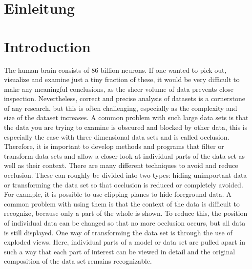 {\chapter{Einleitung}}
{\chapter{Introduction}}

\label{sec:introduction}

The human brain consists of 86 billion neurons\cite{peichl_2015}. If one wanted to pick out, visualize and examine just a tiny fraction of these, it would be very difficult to make any meaningful conclusions, as the sheer volume of data prevents close inspection.
Nevertheless, correct and precise analysis of datasets is a cornerstone of any research, but this is often challenging, especially as the complexity and size of the dataset increases.
A common problem with such large data sets is that the data you are trying to examine is obscured and blocked by other data, this is especially the case with three dimensional data sets and is called occlusion.
Therefore, it is important to develop methods and programs that filter or transform data sets and allow a closer look at individual parts of the data set as well as their context. 
There are many different techniques to avoid and reduce occlusion. These can roughly be divided into two types: hiding unimportant data or transforming the data set so that occlusion is reduced or completely avoided.
For example, it is possible to use clipping planes to hide foreground data. A common problem with using them is that the context of the data is difficult to recognize, because only a part of the whole is shown. 
To reduce this, the position of individual data can be changed so that no more occlusion occurs, but all data is still displayed. 
One way of transforming the data set is through the use of exploded views. Here, individual parts of a model or data set are pulled apart in such a way that each part of interest can be viewed in detail and the original composition of the data set remains recognizable. 

